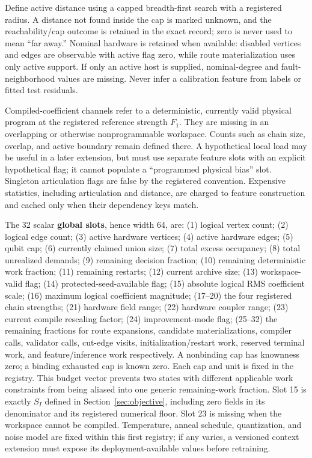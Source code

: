 \documentclass[11pt,a4paper]{article}
\theoremstyle{definition}\newtheorem{definition}[proposition]{Definition}
\begin{document}
Define active distance using a capped breadth-first search with a registered radius. A distance not found inside the cap is marked unknown, and the reachability/cap outcome is retained in the exact record; zero is never used to mean ``far away.'' Nominal hardware is retained when available: disabled vertices and edges are observable with active flag zero, while route materialization uses only active support. If only an active host is supplied, nominal-degree and fault-neighborhood values are missing. Never infer a calibration feature from labels or fitted test residuals.

Compiled-coefficient channels refer to a deterministic, currently valid physical program at the registered reference strength \(F_1\). They are missing in an overlapping or otherwise nonprogrammable workspace. Counts such as chain size, overlap, and active boundary remain defined there. A hypothetical local load may be useful in a later extension, but must use separate feature slots with an explicit hypothetical flag; it cannot populate a ``programmed physical bias'' slot. Singleton articulation flags are false by the registered convention. Expensive statistics, including articulation and distance, are charged to feature construction and cached only when their dependency keys match.

The 32 scalar \textbf{global slots}, hence width 64, are: (1) logical vertex count; (2) logical edge count; (3) active hardware vertices; (4) active hardware edges; (5) qubit cap; (6) currently claimed union size; (7) total excess occupancy; (8) total unrealized demands; (9) remaining decision fraction; (10) remaining deterministic work fraction; (11) remaining restarts; (12) current archive size; (13) workspace-valid flag; (14) protected-seed-available flag; (15) absolute logical RMS coefficient scale; (16) maximum logical coefficient magnitude; (17--20) the four registered chain strengths; (21) hardware field range; (22) hardware coupler range; (23) current compile rescaling factor; (24) improvement-mode flag; (25--32) the remaining fractions for route expansions, candidate materializations, compiler calls, validator calls, cut-edge visits, initialization/restart work, reserved terminal work, and feature/inference work respectively. A nonbinding cap has knownness zero; a binding exhausted cap is known zero. Each cap and unit is fixed in the registry. This budget vector prevents two states with different applicable work constraints from being aliased into one generic remaining-work fraction. Slot 15 is exactly $S_I$ defined in Section~\ref{sec:objective}, including zero fields in its denominator and its registered numerical floor. Slot 23 is missing when the workspace cannot be compiled. Temperature, anneal schedule, quantization, and noise model are fixed within this first registry; if any varies, a versioned context extension must expose its deployment-available values before retraining.
\end{document}
